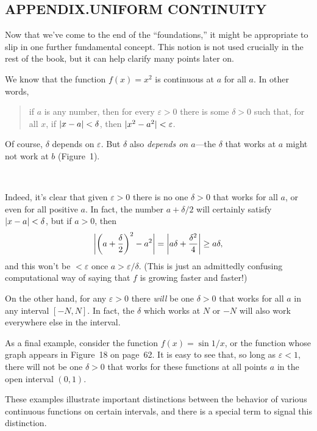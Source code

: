 \subsection*{APPENDIX.\quad UNIFORM CONTINUITY}

Now that we've come to the end of the ``foundations,'' it might be
appropriate to slip in one further fundamental concept. This notion is not
used crucially in the rest of the book, but it can help clarify many points
later on.

We know that the function $f(x) = x^2$ is continuous at $a$ for all $a$. In
other words,
\begin{quote}
if $a$ is any number, then for every $\varepsilon > 0$ there is some
$\delta > 0$ such that, for all $x$, if $\abs{x - a} < \delta$, then
$\abs{x^2 - a^2} < \varepsilon$.
\end{quote}
Of course, $\delta$ depends on $\varepsilon$. But $\delta$ also \emph{depends
on $a$}---the $\delta$ that works at $a$ might not work at $b$ (Figure~1).
\begin{center}
\\[0.6em]
\end{center}
Indeed, it's clear that given $\varepsilon > 0$ there is no one $\delta > 0$
that works for all $a$, or even for all positive $a$. In fact, the number
$a + \delta/2$ will certainly satisfy $\abs{x - a} < \delta$, but if
$a > 0$, then
\[
\abs[\bigg]{\biggl(a + \frac{\delta}{2}\biggr)^2 - a^2}
= \abs[\bigg]{a\delta + \frac{\delta^2}{4}} \geq a\delta,
\]
and this won't be $< \varepsilon$ once $a > \varepsilon/\delta$. (This is
just an admittedly confusing computational way of saying that $f$ is growing
faster and faster!)

On the other hand, for any $\varepsilon > 0$ there \emph{will} be one
$\delta > 0$ that works for all $a$ in any interval $[-N,N]$. In fact, the
$\delta$ which works at $N$ or $-N$ will also work everywhere else in the
interval.

As a final example, consider the function $f(x) = \sin 1/x$, or the function
whose graph appears in Figure~18 on page~62. It is easy to see that, so long
as $\varepsilon < 1$, there will not be one $\delta > 0$ that works for these
functions at all points $a$ in the open interval $(0,1)$.

These examples illustrate important distinctions between the behavior of
various continuous functions on certain intervals, and there is a special
term to signal this distinction.

